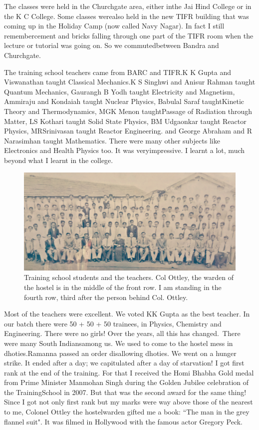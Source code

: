 The classes were held in the Churchgate area, either in\break the Jai Hind College or in the K C College. Some classes were\break also held in the new TIFR building that was coming up in the Holiday Camp (now called Navy Nagar). In fact I still remember\break cement and bricks falling through one part of the TIFR room when the lecture or tutorial was going on. So we commuted\break between Bandra and Churchgate.

The training school teachers came from BARC and TIFR.\break K K Gupta and 
Viswanathan taught Classical Mechanics.\break K S Singhwi and Anisur Rahman 
taught Quantum Mechanics, Gaurangh B Yodh taught Electricity and 
Magnetism, Ammiraju and Kondaiah taught Nuclear Physics, Babulal Saraf 
taught\break Kinetic Theory and Thermodynamics, MGK Menon taught\break Passage of 
Radiation through Matter, LS Kothari taught Solid State Physics, BM 
Udgaonkar taught Reactor Physics, MR\break Srinivasan taught Reactor 
Engineering. and George Abraham and R Narasimhan taught Mathematics. 
There were many other subjects like Electro\-nics and Health Physics too. 
It was very\break impressive. I learnt a lot, much beyond what I learnt in the 
colleg\-e.
\smallskip

\begin{figure}[H]
\centering
\includegraphics[width=1\textwidth]{images/new-images/06-Rajaji-TS.jpg}
\caption{\small{Training school students and the teachers. Col Ottley, the warden of the hostel is in the middle of the front row. I am standing in the fourth row, third after the person behind Col. Ottley.}}
\end{figure}

Most of the teachers were excellent. We voted KK Gupta as the best teacher.
In our batch there were 50 + 50 + 50 trainees, in Physics, Chemistry
and Engineering. There were no girls! Over the years, all this has changed.\
There were many South Indians\break among us. We used to come to the hostel 
mess in dhoties.\break Ramanna passed an order disallowing dhoties. We went on 
a hunger strike. It ended after a day; we capitulated after a day of 
starvation!
\vskip 1pt
I got first rank at the end of the training. For that I received the 
Homi Bhabha Gold medal from Prime Minister Manmohan Singh during the 
Golden Jubilee celebration of the Training\break School in 2007. But that was 
the second award for the same thing! Since I got not only first rank but 
my marks were way above those of the nearest to me, Colonel Ottley the 
hostel\break warden gifted me a book: ``The man in the grey flannel suit". It 
was filmed in Hollywood with the famous actor Gregory Peck.
 

